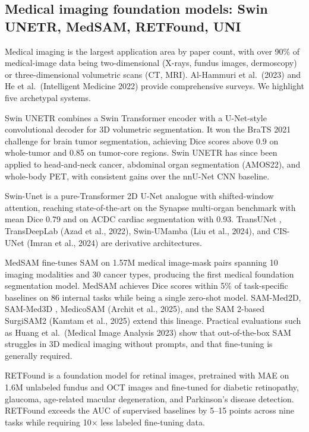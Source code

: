 \documentclass{article}
\begin{document}
\subsection{Medical imaging foundation models: Swin UNETR, MedSAM, RETFound, UNI}\label{medical-imaging-foundation-models-swin-unetr-medsam-retfound-uni}

Medical imaging is the largest application area by paper count, with over 90\% of medical-image data being two-dimensional (X-rays, fundus images, dermoscopy) or three-dimensional volumetric scans (CT, MRI). Al-Hammuri et al.~(2023) and He et al.~(Intelligent Medicine 2022) provide comprehensive surveys. We highlight five archetypal systems.

Swin UNETR \citep{hatamizadeh2022swinunetrswintrans} combines a Swin Transformer encoder with a U-Net-style convolutional decoder for 3D volumetric segmentation. It won the BraTS 2021 challenge for brain tumor segmentation, achieving Dice scores above 0.9 on whole-tumor and 0.85 on tumor-core regions. Swin UNETR has since been applied to head-and-neck cancer, abdominal organ segmentation (AMOS22), and whole-body PET, with consistent gains over the nnU-Net CNN baseline.

Swin-Unet \citep{cao2023swinunetunetlikepu} is a pure-Transformer 2D U-Net analogue with shifted-window attention, reaching state-of-the-art on the Synapse multi-organ benchmark with mean Dice 0.79 and on ACDC cardiac segmentation with 0.93. TransUNet \citep{chen2022mobileformerbridgi}, TransDeepLab (Azad et al., 2022), Swin-UMamba (Liu et al., 2024), and CIS-UNet (Imran et al., 2024) are derivative architectures.

MedSAM \citep{ma2024segmentanythinginm} fine-tunes SAM on 1.57M medical image-mask pairs spanning 10 imaging modalities and 30 cancer types, producing the first medical foundation segmentation model. MedSAM achieves Dice scores within 5\% of task-specific baselines on 86 internal tasks while being a single zero-shot model. SAM-Med2D, SAM-Med3D \citep{wang2025visiontransformers}, MedicoSAM (Archit et al., 2025), and the SAM 2-based SurgiSAM2 (Kamtam et al., 2025) extend this lineage. Practical evaluations such as Huang et al.~(Medical Image Analysis 2023) show that out-of-the-box SAM struggles in 3D medical imaging without prompts, and that fine-tuning is generally required.

RETFound \citep{zhou2023afoundationmodelfo} is a foundation model for retinal images, pretrained with MAE on 1.6M unlabeled fundus and OCT images and fine-tuned for diabetic retinopathy, glaucoma, age-related macular degeneration, and Parkinson's disease detection. RETFound exceeds the AUC of supervised baselines by 5--15 points across nine tasks while requiring 10× less labeled fine-tuning data.
\end{document}
